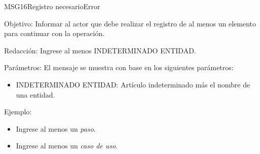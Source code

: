 \begin{mensaje}{MSG16}{Registro necesario}{Error}
	\item [Objetivo:] Informar al actor que debe realizar el registro de al menos un elemento para continuar con la operación.
	\item[Redacción:] Ingrese al menos INDETERMINADO ENTIDAD.
	\item[Parámetros:] El mensaje se muestra con base en los siguientes parámetros:
	\begin{itemize}
		\item INDETERMINADO ENTIDAD: Artículo indeterminado más el nombre de una entidad.
	\end{itemize}
	\item[Ejemplo:] \begin{itemize}
		\item Ingrese al menos un {\em paso}.
		\item Ingrese al menos un {\em caso de uso}.
	\end{itemize}
\end{mensaje}